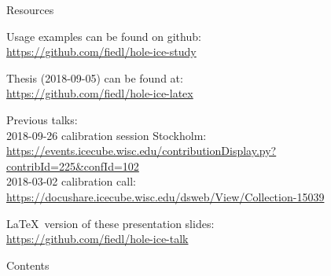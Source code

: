 \begin{frame}{Resources}
  \begin{center}
    Usage examples can be found on github: \\ \vspace{0.2cm}
    \url{https://github.com/fiedl/hole-ice-study}

    \vspace{1cm}

    Thesis (2018-09-05) can be found at: \\ \vspace{0.2cm}
    \url{https://github.com/fiedl/hole-ice-latex}

    \vspace{1cm}

    Previous talks: \\ \vspace{0.2cm}
    2018-09-26 calibration session Stockholm: \\
      \footnotesize\url{https://events.icecube.wisc.edu/contributionDisplay.py?contribId=225\&confId=102}\normalsize \\ \vspace{0.1cm}
    2018-03-02 calibration call: \\
      \footnotesize\url{https://docushare.icecube.wisc.edu/dsweb/View/Collection-15039}\normalsize

    \vspace{1cm}

    \LaTeX\ version of these presentation slides: \\ \vspace{0.2cm}
    \url{https://github.com/fiedl/hole-ice-talk}
  \end{center}
\end{frame}

\begin{frame}{Contents}

  \tableofcontents[subsectionstyle=show]


\end{frame}
